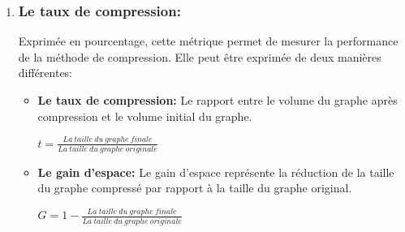 \begin{enumerate}[label=\alph*)]
				\item 	\subsubsection{Le taux de compression:}
				Exprimée en pourcentage, cette métrique permet de mesurer la performance de la méthode de compression. Elle peut être exprimée de deux manières différentes:
				
				\begin{itemize}
					\item \textbf{Le taux de compression:} Le rapport entre le volume du graphe après compression et le volume initial du graphe.
					\begin{center}
				$
				t = \frac{La\ taille\ du\ graphe\ finale}{La\ taille\ du\ graphe\ originale }
				$
				\end{center}
					\item \textbf{Le gain d'espace: }Le gain d'espace représente la réduction de la taille du graphe compressé par rapport à la taille du graphe original.
					
					\begin{center}
				$
				G = 1 - \frac{La\ taille\ du\ graphe\ finale}{La\ taille\ du\ graphe\ originale }
				$
				\end{center}
					
					
				\end{itemize}
				\end{enumerate}
				
				
				
				
				
				
				
				
				
			